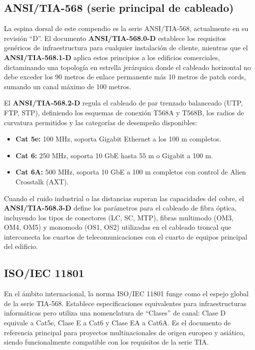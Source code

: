 \documentclass[a4paper,12pt]{article}
\begin{document}
\subsection*{ANSI/TIA-568 (serie principal de cableado)}

La espina dorsal de este compendio es la serie ANSI/TIA-568, actualmente en su revisión ``D''. El documento \textbf{ANSI/TIA-568.0-D} establece los requisitos genéricos de infraestructura para cualquier instalación de cliente, mientras que el \textbf{ANSI/TIA-568.1-D} aplica estos principios a los edificios comerciales, dictaminando una topología en estrella jerárquica donde el cableado horizontal no debe exceder los 90 metros de enlace permanente más 10 metros de patch cords, sumando un canal máximo de 100 metros.

El \textbf{ANSI/TIA-568.2-D} regula el cableado de par trenzado balanceado (UTP, FTP, STP), definiendo los esquemas de conexión T568A y T568B, los radios de curvatura permitidos y las categorías de desempeño disponibles:

\begin{itemize}
    \item \textbf{Cat 5e:} 100 MHz, soporta Gigabit Ethernet a los 100 m completos.
    \item \textbf{Cat 6:} 250 MHz, soporta 10 GbE hasta 55 m o Gigabit a 100 m.
    \item \textbf{Cat 6A:} 500 MHz, soporta 10 GbE a 100 m completos con control de Alien Crosstalk (AXT).
\end{itemize}

Cuando el ruido industrial o las distancias superan las capacidades del cobre, el \textbf{ANSI/TIA-568.3-D} define los parámetros para el cableado de fibra óptica, incluyendo los tipos de conectores (LC, SC, MTP), fibras multimodo (OM3, OM4, OM5) y monomodo (OS1, OS2) utilizadas en el cableado troncal que interconecta los cuartos de telecomunicaciones con el cuarto de equipos principal del edificio.

\subsection*{ISO/IEC 11801}

En el ámbito internacional, la norma ISO/IEC 11801 funge como el espejo global de la serie TIA-568. Establece especificaciones equivalentes para infraestructuras informáticas pero utiliza una nomenclatura de ``Clases'' de canal: Clase D equivale a Cat5e, Clase E a Cat6 y Clase EA a Cat6A. Es el documento de referencia principal para proyectos multinacionales de origen europeo y asiático, siendo funcionalmente compatible con los requisitos de la serie TIA.
\end{document}
